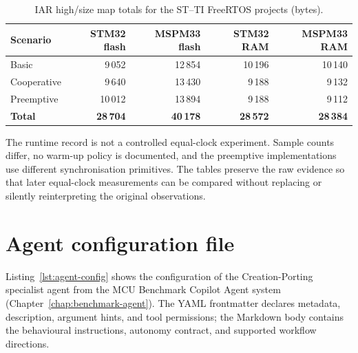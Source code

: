 \begin{table}[H]
\centering
\caption{IAR high/size map totals for the ST--TI FreeRTOS projects (bytes).}
\label{tab:appendix-ti-freertos-footprint}
\begin{tabular}{l r r r r}
\toprule
\textbf{Scenario} & \textbf{STM32 flash} & \textbf{MSPM33 flash} & \textbf{STM32 RAM} & \textbf{MSPM33 RAM} \\
\midrule
Basic & 9\,052 & 12\,854 & 10\,196 & 10\,140 \\
Cooperative & 9\,640 & 13\,430 & 9\,188 & 9\,132 \\
Preemptive & 10\,012 & 13\,894 & 9\,188 & 9\,112 \\
\midrule
\textbf{Total} & \textbf{28\,704} & \textbf{40\,178} & \textbf{28\,572} & \textbf{28\,384} \\
\bottomrule
\end{tabular}
\end{table}

The runtime record is not a controlled equal-clock experiment. Sample counts differ, no
warm-up policy is documented, and the preemptive implementations use different synchronisation
primitives. The tables preserve the raw evidence so that later equal-clock measurements can be
compared without replacing or silently reinterpreting the original observations.

\pagebreak

\section{Agent configuration file}
\label{sec:appendix-agent-config}

Listing~\ref{lst:agent-config} shows the configuration of the Creation-Porting specialist
agent from the MCU Benchmark Copilot Agent system
(Chapter~\ref{chap:benchmark-agent}). The YAML frontmatter declares metadata, description,
argument hints, and tool permissions; the Markdown body contains the behavioural
instructions, autonomy contract, and supported workflow directions.

